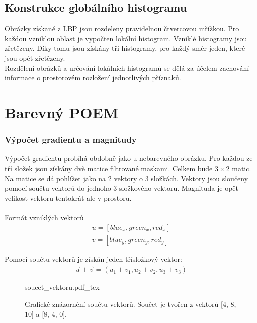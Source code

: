 \documentclass[czech,BP]{thesiskiv}
\begin{document}
\subsection{Konstrukce globálního histogramu}
\par Obrázky získané z LBP jsou rozdeleny pravidelnou čtvercovou mřížkou. Pro každou vzniklou oblast je vypočten lokální histogram. Vzniklé histogramy jsou zřetězeny. Díky tomu jsou získány tři histogramy, pro každý směr jeden, které jsou opět zřetězeny. \\
Rozdělení obrázků a určování lokálních histogramů se dělá za účelem zachování informace o prostorovém rozložení jednotlivých příznaků.

\section{Barevný POEM}
\subsubsection{Výpočet gradientu a magnitudy}
Výpočet gradientu probíhá obdobně jako u nebarevného obrázku. Pro každou ze tří složek jsou získány dvě matice filtrované maskami. Celkem bude $3 \times 2$ matic. Na matice se dá pohlížet jako na 2 vektory o 3 složkách. Vektory jsou sloučeny pomocí součtu vektorů do jednoho 3 složkového vektoru. Magnituda je opět velikost vektoru tentokrát ale v prostoru. \\
\\
Formát vzniklých vektorů 
\begin{align}
	\label{barevny_poem_vznikle_vektory}
			 u = [blue_x, green_x, red_x] \\
			 v = [blue_y, green_y, red_y]
\end{align}

Pomocí součtu vektorů je získán jeden třísložkový vektor:
\begin{align}
   \label{soucet_vektrou} \vec{u} + \vec{v} = (u_1 + v_1, u_2 + v_2, u_3 + v_3 )
\end{align} 

\begin{figure}[H]
    \centering
    \def\svgwidth{\columnwidth}
    {soucet_vektoru.pdf_tex} 
    \caption{Grafické znázornění součtu vektorů. Součet je tvořen z vektorů [4, 8, 10] a [8, 4, 0].}
\end{figure}
\end{document}
